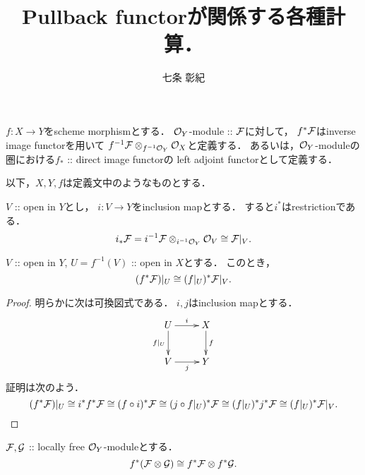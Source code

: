 \documentclass[a4paper]{jsarticle}
\begin{document}
\title{Pullback functorが関係する各種計算．}
\author{七条 彰紀}
\maketitle

\begin{Def}
    $f: X \to Y$をscheme morphismとする．
    $\mathcal{O}_Y$-module :: $\mathcal{F}$に対して，
    $f^*\mathcal{F}$はinverse image functorを用いて
    $f^{-1}\mathcal{F} \otimes_{f^{-1}\mathcal{O}_Y} \mathcal{O}_X$と定義する．
    あるいは，$\mathcal{O}_Y$-moduleの圏における$f_*$ :: direct image functorの
    left adjoint functorとして定義する．
\end{Def}
    以下，$X,Y,f$は定義文中のようなものとする．

$V$ :: open in $Y$とし，
$i: V \to Y$をinclusion mapとする．
すると$i^*$はrestrictionである．
\[
    i_*\mathcal{F}
    =i^{-1}\mathcal{F} \otimes_{i^{-1}\mathcal{O}_Y} \mathcal{O}_V
    \cong \mathcal{F}|_V.
\]

\begin{Prop}
    $V$ :: open in $Y$, $U=f^{-1}(V)$ :: open in $X$とする．
    このとき，
    \[ (f^* \mathcal{F})|_U \cong (f|_U)^* \mathcal{F}|_V. \]
\end{Prop}
\begin{proof}
    明らかに次は可換図式である．
    $i,j$はinclusion mapとする．
    \[
        \xymatrix
        {
            U \ar[d]_-{f|_U}\ar[r]^-{i}& X\ar[d]^-{f} \\
            V \ar[r]_-{j}& Y
        }
    \]
    証明は次のよう．
    \[
                (f^* \mathcal{F})|_U
        \cong    i^* f^* \mathcal{F}
        \cong    (f \circ i)^* \mathcal{F}
        \cong    (j \circ f|_U)^* \mathcal{F}
        \cong    (f|_U)^* j^*\mathcal{F}
        \cong    (f|_U)^* \mathcal{F}|_V.
    \]
\end{proof}

\begin{Prop}
    $\mathcal{F}, \mathcal{G}$ :: locally free $\mathcal{O}_Y$-moduleとする．
    \[ f^*(\mathcal{F} \otimes \mathcal{G}) \cong f^*\mathcal{F} \otimes f^*\mathcal{G}. \]
\end{Prop}
\end{document}
